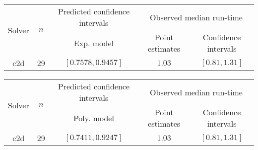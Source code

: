 \begin{tabular}{ccccc}
\hline 
\multirow{2}{*}{Solver} & \multirow{2}{*}{$n$} & Predicted confidence intervals & \multicolumn{2}{c}{Observed median  run-time}\tabularnewline
 &  & Exp. model  & Point estimates  & Confidence intervals\tabularnewline
\hline 
\hline 
\multirow{0}{*}{c2d} & 29 & $\mathbf{\left[0.7578,0.9457\right]}$ & $1.03$ & $\left[0.81,1.31\right]$ \tabularnewline 
\hline 
\end{tabular} 

\begin{tabular}{ccccc}
\hline 
\multirow{2}{*}{Solver} & \multirow{2}{*}{$n$} & Predicted confidence intervals & \multicolumn{2}{c}{Observed median  run-time}\tabularnewline
 &  & Poly. model  & Point estimates  & Confidence intervals\tabularnewline
\hline 
\hline 
\multirow{0}{*}{c2d} & 29 & $\mathbf{\left[0.7411,0.9247\right]}$ & $1.03$ & $\left[0.81,1.31\right]$ \tabularnewline 
\hline 
\end{tabular} 


